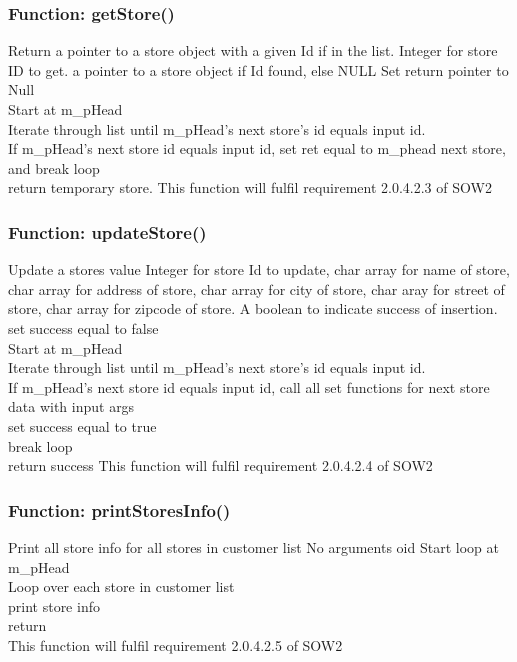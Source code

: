 \documentclass[12pt]{article}%
\newcounter{subsubsubsection}[subsubsection]
\begin{document}
\subsubsection{Function: getStore()}
Return a pointer to a store object with a given Id if in the list.
Integer for store ID to get.
a pointer to a store object if Id found, else NULL
Set return pointer to Null \\
Start at m_pHead \\
Iterate through list until m_pHead's next store's id equals input id. \\
If m_pHead's next store id equals input id, set ret equal to m_phead next store, and break loop \\
return temporary store.
This function will fulfil requirement 2.0.4.2.3 of SOW2

\subsubsection{Function: updateStore()}
Update a stores value
Integer for store Id to update, char array for name of store, char array for address of store,
char array for city of store, char aray for street of store, char array for zipcode of store.
A boolean to indicate success of insertion.
set success equal to false \\
Start at m_pHead \\
Iterate through list until m_pHead's next store's id equals input id. \\
\quad If m_pHead's next store id equals input id, call all set functions for next store data with input args \\
\quad \quad set success equal to true \\
\quad \quad break loop \\
return success
This function will fulfil requirement 2.0.4.2.4 of SOW2

\subsubsection{Function: printStoresInfo()}
Print all store info for all stores in customer list
No arguments
oid
Start loop at m_pHead \\
Loop over each store in customer list \\
\quad print store info \\
return\\
This function will fulfil requirement 2.0.4.2.5 of SOW2
\end{document}
